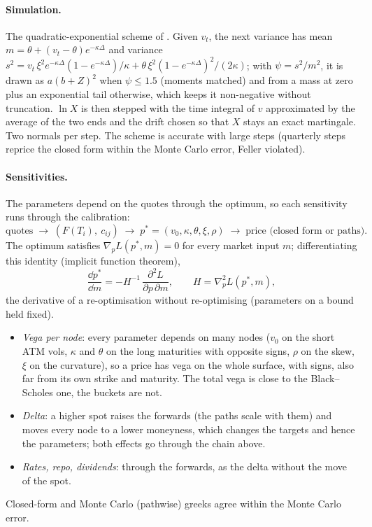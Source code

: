 \paragraph{Simulation.} The quadratic-exponential scheme of \citet{andersen2008} \citep[see also][sec.~9.3.4]{oosterlee2019}. Given $v_t$, the next variance has mean
$m = \theta + (v_t - \theta)e^{-\kappa\Delta}$ and variance
$s^2 = v_t\,\xi^2 e^{-\kappa\Delta}(1 - e^{-\kappa\Delta})/\kappa + \theta\,\xi^2 (1 - e^{-\kappa\Delta})^2/(2\kappa)$; with $\psi = s^2/m^2$, it is drawn as
$a(b + Z)^2$ when $\psi \le 1.5$ (moments matched) and from a mass at zero plus an exponential tail otherwise, which keeps it
non-negative without truncation. $\ln X$ is then stepped with the time integral of $v$ approximated by the average of
the two ends and the drift chosen so that $X$ stays an exact martingale. Two normals per step. The scheme is accurate
with large steps (quarterly steps reprice the closed form within the Monte Carlo error, Feller violated).

\paragraph{Sensitivities.} The parameters depend on the quotes through the optimum, so each sensitivity runs through
the calibration:
\[
  \text{quotes} \;\to\; (F(T_i),\ c_{ij}) \;\to\; p^* = (v_0, \kappa, \theta, \xi, \rho) \;\to\; \text{price (closed form or paths)} .
\]
The optimum satisfies $\nabla_p L(p^*, m) = 0$ for every market input $m$; differentiating this identity
(implicit function theorem),
\[
  \frac{\dd p^*}{\dd m} = -H^{-1}\,\frac{\partial^2 L}{\partial p\,\partial m},\qquad H = \nabla^2_p L(p^*, m),
\]
the derivative of a re-optimisation without re-optimising (parameters on a bound held fixed).
\begin{itemize}[nosep]
  \item \emph{Vega per node}: every parameter depends on many nodes ($v_0$ on the short ATM vols, $\kappa$ and $\theta$ on the long
        maturities with opposite signs, $\rho$ on the skew, $\xi$ on the curvature), so a price has vega on the whole surface,
        with signs, also far from its own strike and maturity. The total vega is close to the Black--Scholes one, the
        buckets are not.
  \item \emph{Delta}: a higher spot raises the forwards (the paths scale with them) and moves every node to a lower
        moneyness, which changes the targets and hence the parameters; both effects go through the chain above.
  \item \emph{Rates, repo, dividends}: through the forwards, as the delta without the move of the spot.
\end{itemize}
Closed-form and Monte Carlo (pathwise) greeks agree within the Monte Carlo error.

